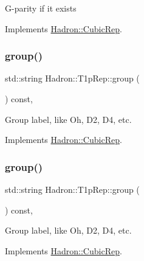 G-\/parity if it exists 

Implements \mbox{\hyperlink{structHadron_1_1CubicRep_a52104e43266d1614c00bbd1c3b395458}{Hadron\+::\+Cubic\+Rep}}.

\mbox{\label{structHadron_1_1T1pRep_aa4bc2345a21f69f38cca9a1049eb7be6}} 
\subsubsection{\texorpdfstring{group()}{group()}\hspace{0.1cm}{\footnotesize\ttfamily [1/3]}}
{\footnotesize\ttfamily std\+::string Hadron\+::\+T1p\+Rep\+::group (\begin{DoxyParamCaption}{ }\end{DoxyParamCaption}) const\hspace{0.3cm}{\ttfamily [inline]}, {\ttfamily [virtual]}}

Group label, like Oh, D2, D4, etc. 

Implements \mbox{\hyperlink{structHadron_1_1CubicRep_a0748f11ec87f387062c8e8981339a29c}{Hadron\+::\+Cubic\+Rep}}.

\mbox{\label{structHadron_1_1T1pRep_aa4bc2345a21f69f38cca9a1049eb7be6}} 
\subsubsection{\texorpdfstring{group()}{group()}\hspace{0.1cm}{\footnotesize\ttfamily [2/3]}}
{\footnotesize\ttfamily std\+::string Hadron\+::\+T1p\+Rep\+::group (\begin{DoxyParamCaption}{ }\end{DoxyParamCaption}) const\hspace{0.3cm}{\ttfamily [inline]}, {\ttfamily [virtual]}}

Group label, like Oh, D2, D4, etc. 

Implements \mbox{\hyperlink{structHadron_1_1CubicRep_a0748f11ec87f387062c8e8981339a29c}{Hadron\+::\+Cubic\+Rep}}.

\mbox{\label{structHadron_1_1T1pRep_aa4bc2345a21f69f38cca9a1049eb7be6}} 
